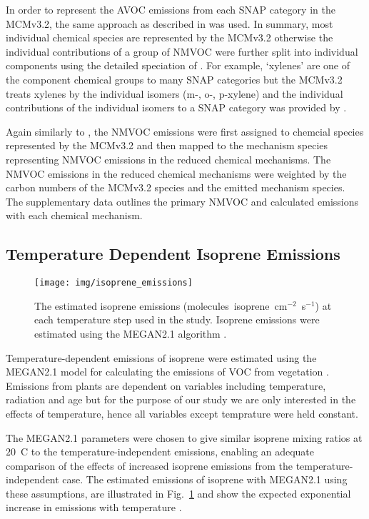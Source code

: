 In order to represent the AVOC emissions from each SNAP category in the MCMv3.2, the same approach as described in \citet{vonSchneidemesser:2015} was used.
In summary, most individual chemical species are represented by the MCMv3.2 otherwise the individual contributions of a group of NMVOC were further split into individual components using the detailed speciation of \citet{Passant:2002}.
For example, `xylenes' are one of the component chemical groups to many SNAP categories but the MCMv3.2 treats xylenes by the individual isomers (m-, o-, p-xylene) and the individual contributions of the individual isomers to a SNAP category was provided by \citet{Passant:2002}.

Again similarly to \citet{vonSchneidemesser:2015}, the NMVOC emissions were first assigned to chemcial species represented by the MCMv3.2 and then mapped to the mechanism species representing NMVOC emissions in the reduced chemical mechanisms.
The NMVOC emissions in the reduced chemical mechanisms were weighted by the carbon numbers of the MCMv3.2 species and the emitted mechanism species. 
The supplementary data outlines the primary NMVOC and calculated emissions with each chemical mechanism.

\subsection{Temperature Dependent Isoprene Emissions} \label{ss:megan}
\begin{figure}[t]%
    \centering%
    \caption{The estimated isoprene emissions (molecules~isoprene~cm$^{-2}$~s$^{-1}$) at each temperature step used in the study. Isoprene emissions were estimated using the MEGAN2.1 algorithm \citep{Guenther:2012}.}
    \label{f:isoprene_emissions}%
    \texttt{[image: img/isoprene\_emissions]}
\end{figure}
Temperature-dependent emissions of isoprene were estimated using the MEGAN2.1 model for calculating the emissions of VOC from vegetation \citep{Guenther:2012}.
Emissions from plants are dependent on variables including temperature, radiation and age but for the purpose of our study we are only interested in the effects of temperature, hence all variables except temprature were held constant.

The MEGAN2.1 parameters were chosen to give similar isoprene mixing ratios at $20$~\degree C to the temperature-independent emissions, enabling an adequate comparison of the effects of increased isoprene emissions from the temperature-independent case.
The estimated emissions of isoprene with MEGAN2.1 using these assumptions, are illustrated in Fig.~\ref{f:isoprene_emissions} and show the expected exponential increase in emissions with temperature \citep{Guenther:2006}.

